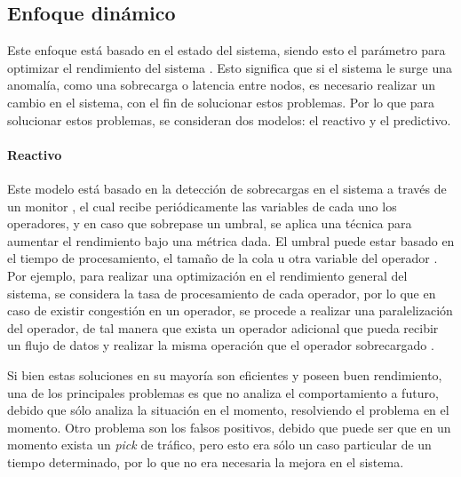 \subsection{Enfoque dinámico}


Este enfoque está basado en el estado del sistema, siendo esto el parámetro para optimizar el rendimiento del sistema \citep{CasavantK88}. Esto significa que si el sistema le surge una anomalía, como una sobrecarga o latencia entre nodos, es necesario realizar un cambio en el sistema, con el fin de solucionar estos problemas. Por lo que para solucionar estos problemas, se consideran dos modelos: el reactivo y el predictivo.

\paragraph{Reactivo}

Este modelo está basado en la detección de sobrecargas en el sistema a través de un monitor \citep{GulisanoJPSV12}, el cual recibe periódicamente las variables de cada uno los operadores, y en caso que sobrepase un umbral, se aplica una técnica para aumentar el rendimiento bajo una métrica dada. El umbral puede estar basado en el tiempo de procesamiento, el tamaño de la cola u otra variable del operador \citep{BhuvanagiriGKS06}. Por ejemplo, para realizar una optimización en el rendimiento general del sistema, se considera la tasa de procesamiento de cada operador, por lo que en caso de existir congestión en un operador, se procede a realizar una paralelización del operador, de tal manera que exista un operador adicional que pueda recibir un flujo de datos y realizar la misma operación que el operador sobrecargado \citep{SchneiderAGBW09}.

Si bien estas soluciones en su mayoría son eficientes y poseen buen rendimiento, una de los principales problemas es que no analiza el comportamiento a futuro, debido que sólo analiza la situación en el momento, resolviendo el problema en el momento. Otro problema son los falsos positivos, debido que puede ser que en un momento exista un \textit{pick} de tráfico, pero esto era sólo un caso particular de un tiempo determinado, por lo que no era necesaria la mejora en el sistema.

